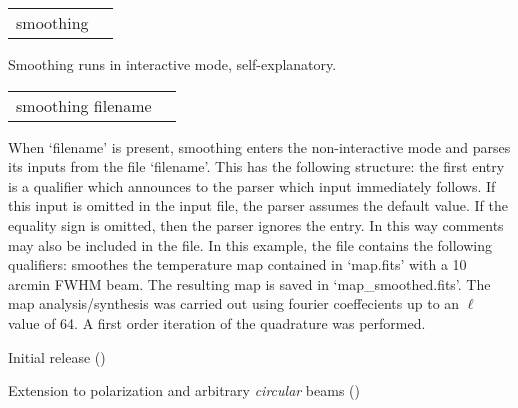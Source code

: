 \begin{examples}{1}
{
\begin{tabular}{ll} %
smoothing  \\
\end{tabular}
}
{
Smoothing runs in interactive mode, self-explanatory. 
}
\end{examples}

\vfill\newpage

\begin{examples}{2}
{
\begin{tabular}{ll} %
smoothing  filename \\
\end{tabular}
}
{When `filename' is present, smoothing enters the non-interactive mode and parses
its inputs from the file `filename'. This has the following
structure: the first entry is a qualifier which announces to the parser
which input immediately follows. If this input is omitted in the
input file, the parser assumes the default value.
If the equality sign is omitted, then the parser ignores the entry.
In this way comments may also be included in the file.
In this example, the file contains the following
qualifiers:\hfill\newline
{}
smoothes the \healpix temperature map contained in `map.fits' with 
a 10 arcmin FWHM beam. The resulting map is saved 
in `map\_smoothed.fits'. The map analysis/synthesis was carried 
out using fourier coeffecients up to an $\ell$ value of 64. A first
order iteration of the quadrature was performed.}

\end{examples}

\begin{release}
  \begin{relist}
    \item Initial release ()
    \item Extension to polarization and arbitrary {\em circular} beams ()
  \end{relist}
\end{release}

